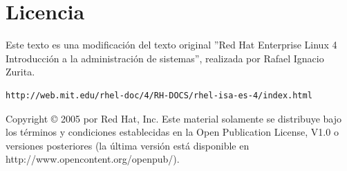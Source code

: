 \documentclass[12pt]{article}
\begin{document}
\section*{Licencia}

Este texto es una modificación del texto original 
''Red Hat Enterprise Linux 4
Introducción a la administración de sistemas'', realizada por Rafael Ignacio Zurita.

\begin{verbatim}
http://web.mit.edu/rhel-doc/4/RH-DOCS/rhel-isa-es-4/index.html
\end{verbatim}

Copyright © 2005 por Red Hat, Inc. Este material solamente se distribuye bajo los términos y condiciones establecidas en la Open Publication License, V1.0 o versiones posteriores (la última versión está disponible en http://www.opencontent.org/openpub/).
\end{document}
